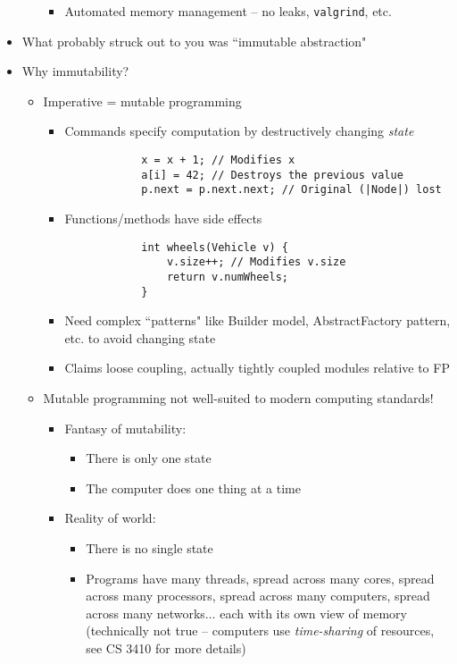 \begin{itemize}
\begin{itemize}
\begin{itemize}
            \item Automated memory management -- no leaks, \texttt{valgrind}, etc.
        \end{itemize}
    \end{itemize}
    \item What probably struck out to you was ``immutable abstraction"
    \item Why immutability?
    \begin{itemize}
        \item Imperative = mutable programming
        \begin{itemize}
        \item Commands specify computation by destructively changing \textit{state}
        \java
        \begin{lstlisting}
            x = x + 1; // Modifies x
            a[i] = 42; // Destroys the previous value
            p.next = p.next.next; // Original (|Node|) lost
        \end{lstlisting}
        \item Functions/methods have side effects
        \begin{lstlisting}
            int wheels(Vehicle v) {
                v.size++; // Modifies v.size
                return v.numWheels;
            }
        \end{lstlisting}
        \ocaml
        \item Need complex ``patterns" like \textsf{Builder} model, \textsf{AbstractFactory} pattern, etc. to avoid changing state
        \item Claims loose coupling, actually tightly coupled modules relative to FP
        \end{itemize}
        \item Mutable programming not well-suited to modern computing standards!
        \begin{itemize}
            \item Fantasy of mutability:
            \begin{itemize}
                \item There is only one state
                \item The computer does one thing at a time
            \end{itemize}
            \item Reality of world:
            \begin{itemize}
                \item There is no single state
                \item Programs have many threads, spread across many cores, spread across many processors, spread across many computers, spread across many networks$\ldots$ each with its own view of memory (technically not true -- computers use \textit{time-sharing} of resources, see CS 3410 for more details)

\end{itemize}
\end{itemize}
\end{itemize}
\end{itemize}
